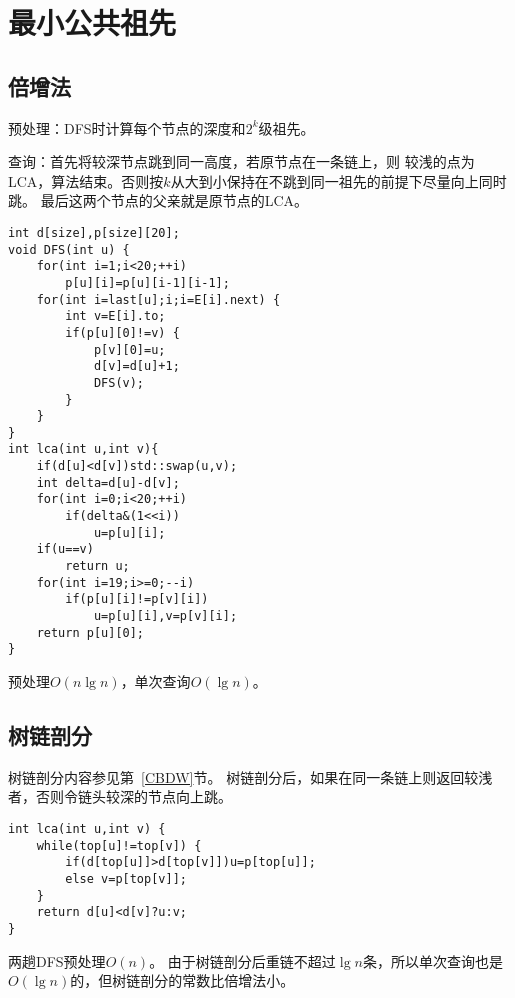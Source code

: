 \section{最小公共祖先}
\subsection{倍增法}
预处理：DFS时计算每个节点的深度和$2^k$级祖先。

查询：首先将较深节点跳到同一高度，若原节点在一条链上，则
较浅的点为LCA，算法结束。否则按$k$从大到小保持在不跳到同一祖先的前提下尽量向上同时跳。
最后这两个节点的父亲就是原节点的LCA。

\begin{lstlisting}
int d[size],p[size][20];
void DFS(int u) {
    for(int i=1;i<20;++i)
        p[u][i]=p[u][i-1][i-1];
    for(int i=last[u];i;i=E[i].next) {
        int v=E[i].to;
        if(p[u][0]!=v) {
            p[v][0]=u;
            d[v]=d[u]+1;
            DFS(v);
        }
    }
}
int lca(int u,int v){
    if(d[u]<d[v])std::swap(u,v);
    int delta=d[u]-d[v];
    for(int i=0;i<20;++i)
        if(delta&(1<<i))
            u=p[u][i];
    if(u==v)
        return u;
    for(int i=19;i>=0;--i)
        if(p[u][i]!=p[v][i])
            u=p[u][i],v=p[v][i];
    return p[u][0];
}
\end{lstlisting}
预处理$O(n\lg n)$，单次查询$O(\lg n)$。
\subsection{树链剖分}
树链剖分内容参见第~\ref{CBDW}节。
树链剖分后，如果在同一条链上则返回较浅者，否则令链头较深的节点向上跳。

\begin{lstlisting}
int lca(int u,int v) {
    while(top[u]!=top[v]) {
        if(d[top[u]]>d[top[v]])u=p[top[u]];
        else v=p[top[v]];
    }
    return d[u]<d[v]?u:v;
}
\end{lstlisting}

两趟DFS预处理$O(n)$。
由于树链剖分后重链不超过$\lg n$条，所以单次查询也是$O(\lg n)$的，但树链剖分的常数比倍增法小。
